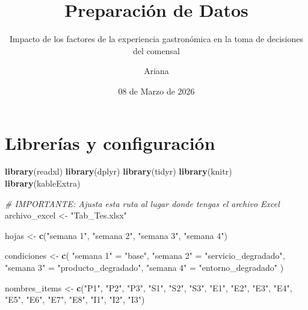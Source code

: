 \documentclass[
  spanish,
]{article}
\title{Preparación de Datos}
\subtitle{Impacto de los factores de la experiencia gastronómica en la
toma de decisiones del comensal}
\author{Ariana}
\date{08 de Marzo de 2026}
\newenvironment{Shaded}{\begin{snugshade}}{\end{snugshade}}
\newcommand{\CommentTok}[1]{\textcolor[rgb]{0.56,0.35,0.01}{\textit{#1}}}
\newcommand{\FunctionTok}[1]{\textcolor[rgb]{0.13,0.29,0.53}{\textbf{#1}}}
\newcommand{\NormalTok}[1]{#1}
\newcommand{\OtherTok}[1]{\textcolor[rgb]{0.56,0.35,0.01}{#1}}
\newcommand{\StringTok}[1]{\textcolor[rgb]{0.31,0.60,0.02}{#1}}
\begin{document}
\maketitle

{
\setcounter{tocdepth}{3}
\tableofcontents
}
\section{Librerías y
configuración}\label{libreruxedas-y-configuraciuxf3n}

\begin{Shaded}
\begin{Highlighting}[]
\FunctionTok{library}\NormalTok{(readxl)}
\FunctionTok{library}\NormalTok{(dplyr)}
\FunctionTok{library}\NormalTok{(tidyr)}
\FunctionTok{library}\NormalTok{(knitr)}
\FunctionTok{library}\NormalTok{(kableExtra)}
\end{Highlighting}
\end{Shaded}

\begin{Shaded}
\begin{Highlighting}[]
\CommentTok{\# IMPORTANTE: Ajusta esta ruta al lugar donde tengas el archivo Excel}
\NormalTok{archivo\_excel }\OtherTok{\textless{}{-}} \StringTok{"Tab\_Tes.xlsx"}

\NormalTok{hojas }\OtherTok{\textless{}{-}} \FunctionTok{c}\NormalTok{(}\StringTok{"semana 1"}\NormalTok{, }\StringTok{"semana 2"}\NormalTok{, }\StringTok{"semana 3"}\NormalTok{, }\StringTok{"semana 4"}\NormalTok{)}

\NormalTok{condiciones }\OtherTok{\textless{}{-}} \FunctionTok{c}\NormalTok{(}
  \StringTok{"semana 1"} \OtherTok{=} \StringTok{"base"}\NormalTok{,}
  \StringTok{"semana 2"} \OtherTok{=} \StringTok{"servicio\_degradado"}\NormalTok{,}
  \StringTok{"semana 3"} \OtherTok{=} \StringTok{"producto\_degradado"}\NormalTok{,}
  \StringTok{"semana 4"} \OtherTok{=} \StringTok{"entorno\_degradado"}
\NormalTok{)}

\NormalTok{nombres\_items }\OtherTok{\textless{}{-}} \FunctionTok{c}\NormalTok{(}\StringTok{"P1"}\NormalTok{, }\StringTok{"P2"}\NormalTok{, }\StringTok{"P3"}\NormalTok{,}
                   \StringTok{"S1"}\NormalTok{, }\StringTok{"S2"}\NormalTok{, }\StringTok{"S3"}\NormalTok{,}
                   \StringTok{"E1"}\NormalTok{, }\StringTok{"E2"}\NormalTok{, }\StringTok{"E3"}\NormalTok{, }\StringTok{"E4"}\NormalTok{,}
                   \StringTok{"E5"}\NormalTok{, }\StringTok{"E6"}\NormalTok{, }\StringTok{"E7"}\NormalTok{, }\StringTok{"E8"}\NormalTok{,}
                   \StringTok{"I1"}\NormalTok{, }\StringTok{"I2"}\NormalTok{, }\StringTok{"I3"}\NormalTok{)}
\end{Highlighting}
\end{Shaded}
\end{document}
